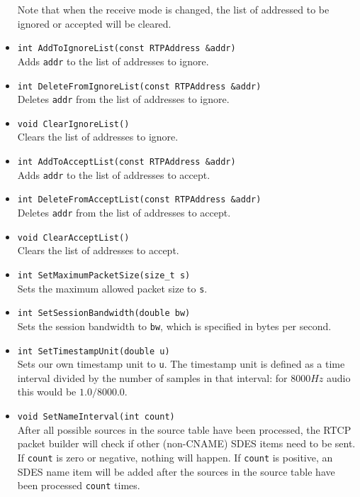 \documentclass[12pt,a4paper]{article}
\begin{document}
\begin{itemize}
\begin{itemize}
						\end{itemize}
						Note that when the receive mode is changed, the list of addressed
						to be ignored or accepted will be cleared.
					\item {\tt int AddToIgnoreList(const RTPAddress \&addr)}\\
						Adds {\tt addr} to the list of addresses to ignore.
					\item {\tt int DeleteFromIgnoreList(const RTPAddress \&addr)}\\
						Deletes {\tt addr} from the list of addresses to ignore.
					\item {\tt void ClearIgnoreList()}\\
						Clears the list of addresses to ignore.
					\item {\tt int AddToAcceptList(const RTPAddress \&addr)}\\
						Adds {\tt addr} to the list of addresses to accept.
					\item {\tt int DeleteFromAcceptList(const RTPAddress \&addr)}\\
						Deletes {\tt addr} from the list of addresses to accept.
					\item {\tt void ClearAcceptList()}\\
						Clears the list of addresses to accept.
					\item {\tt int SetMaximumPacketSize(size\_t s)}\\
						Sets the maximum allowed packet size to {\tt s}.
					\item {\tt int SetSessionBandwidth(double bw)}\\
						Sets the session bandwidth to {\tt bw}, which is specified
						in bytes per second.
					\item {\tt int SetTimestampUnit(double u)}\\
						Sets our own timestamp unit to {\tt u}. The timestamp unit
						is defined as a time interval divided by the number of
						samples in that interval: for $8000 Hz$ audio this would
						be $1.0/8000.0$.
					\item {\tt void SetNameInterval(int count)}\\
						After all possible sources in the source table have been
						processed, the RTCP packet builder will check if other (non-CNAME) SDES 
						items need to be sent. If {\tt count} is zero or negative, nothing
						will happen. If {\tt count} is positive, an SDES name
						item will be added after the sources in the source table have
						been processed {\tt count} times.

\end{itemize}
\end{document}
